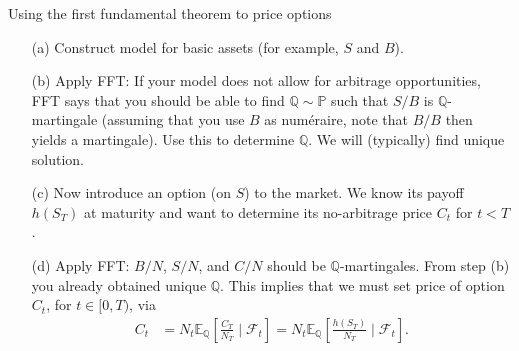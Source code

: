 \documentclass[pdf, handout]{beamer}
\begin{document}
\begin{frame}{Using the first fundamental theorem to price options}
\begin{itemize}
\item[(a)] Construct model for basic assets (for example, $S$ and $B$).
\item[(b)] Apply FFT: If your model does not allow for arbitrage opportunities, FFT says that you should be able to find $\mathbb{Q}\sim\mathbb{P}$ such that $S/B$ is $\mathbb{Q}$-martingale (assuming that you use $B$ as num\'{e}raire, note that $B/B$ then yields a martingale).
Use this to determine $\mathbb{Q}$. We will (typically) find unique solution.
\item[(c)] Now introduce an option (on $S$) to the market. We know its payoff $h(S_T)$ at maturity and
want to determine its no-arbitrage price $C_t$ for $t<T$.
\item[(d)] Apply FFT: $B/N$, $S/N$, and $C/N$ should be $\mathbb{Q}$-martingales.
From step (b) you already obtained unique $\mathbb{Q}$. 
This implies that we must set price of option $C_t$, for $t\in [0, T)$, via
\begin{align*}
C_t &=  N_t \mathbb{E}_{\mathbb{Q}}\left[ 
\frac{C_T}{N_T} \mid \mathcal{F}_t
\right] = N_t \mathbb{E}_{\mathbb{Q}}\left[ 
\frac{h(S_T)}{N_T} \mid \mathcal{F}_t
\right].
\end{align*}
\end{itemize}
\end{frame}
\end{document}
